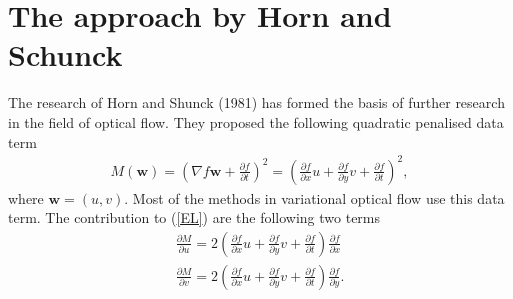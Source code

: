 \documentclass[10pt,a4paper]{article}
\begin{document}
\section{The approach by Horn and Schunck}
The research of Horn and Shunck (1981) has formed the basis of further research in the field of optical flow. They proposed the following quadratic penalised data term
\begin{align}
M(\textbf{w}) = (\nabla f \textbf{w} + \frac{\partial f}{\partial t})^2 = (\frac{\partial f}{\partial x} u + \frac{\partial f}{\partial y} v + \frac{\partial f}{\partial t})^2,
\end{align}
where $\textbf{w} = (u,v)$. Most of the methods in variational optical flow use this data term. The contribution to (\ref{EL}) are the following two terms
\begin{equation}
\begin{aligned}
\frac{\partial M}{\partial u} = 2(\frac{\partial f}{\partial x}u + \frac{\partial f}{\partial y}v + \frac{\partial f}{\partial t}) \frac{\partial f}{\partial x} \\
\frac{\partial M}{\partial v} = 2(\frac{\partial f}{\partial x}u + \frac{\partial f}{\partial y}v + \frac{\partial f}{\partial t}) \frac{\partial f}{\partial y}. \\
\end{aligned}
\end{equation}
\end{document}
